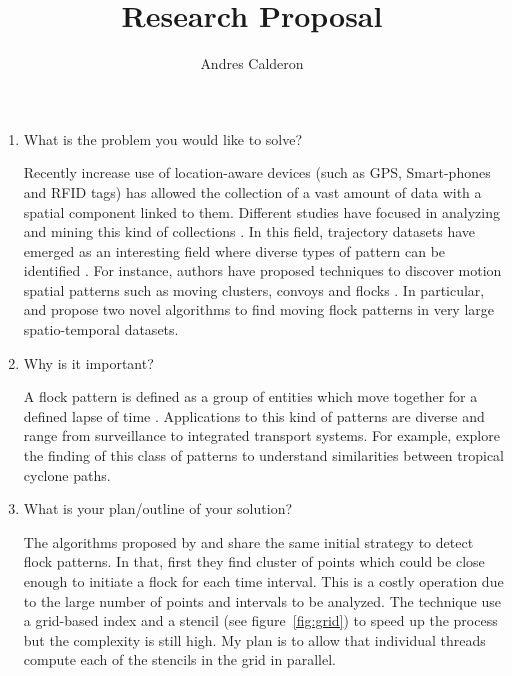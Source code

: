 \documentclass[a4paper, 12pt]{scrartcl}
\title{Research Proposal}
\author{Andres Calderon}
\begin{document}
\maketitle

\begin{enumerate}
 \item What is the problem you would like to solve?
 
Recently increase use of location-aware devices (such as GPS, Smart-phones and RFID tags) has allowed the collection of a vast amount of data with a spatial component linked to them.  Different studies have focused in analyzing and mining this kind of collections \citep{leung_knowledge_2010}\citep{Miller_2001}.  In this field, trajectory datasets have emerged as an interesting field where diverse types of pattern can be identified \citep{zheng_computing_2011}\citep{vieira_spatio-temporal_2013}.  For instance, authors have proposed techniques to discover motion spatial patterns such as moving clusters\citep{kalnis_discovering_2005}, convoys\citep{jeung_discovery_2008} and flocks \citep{benkert_reporting_2006}\citep{gudmundsson_computing_2006}.  In particular, \citep{vieira_-line_2009} and \citep{turdukulov_visual_2014} propose two novel algorithms to find moving flock patterns in very large spatio-temporal datasets.
 
 \item Why is it important?
 
A flock pattern is defined as a group of entities which move together for a defined lapse of time \citep{benkert_reporting_2006}.  Applications to this kind of patterns are diverse and range from surveillance to integrated transport systems.  For example, \citep{turdukulov_visual_2014} explore the finding of this class of patterns to understand similarities between tropical cyclone paths.  
 
 \item What is your plan/outline of your solution?
 
The algorithms proposed by \citep{vieira_-line_2009} and \citep{turdukulov_visual_2014} share the same initial strategy to detect flock patterns.  In that, first they find cluster of points which could be close enough to initiate a flock for each time interval.  This is a costly operation due to the large number of points and intervals to be analyzed.  The technique use a grid-based index and a stencil (see figure~\ref{fig:grid}) to speed up the process but the complexity is still high.  My plan is to allow that individual threads compute each of the stencils in the grid in parallel.


\end{enumerate}
\end{document}
